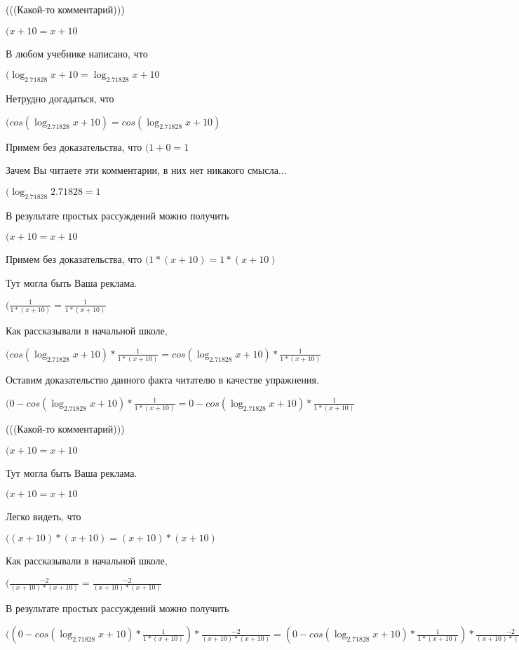 \documentclass[12pt,a4paper,fleqn]{article}
\theoremstyle{definition}
\begin{document}
(((Какой-то комментарий)))

$( x  +  10  =  x  +  10 $

В любом учебнике написано, что

$(\log_{ 2.71828 }{ x  +  10 } = \log_{ 2.71828 }{ x  +  10 }$

Нетрудно догадаться, что

$(cos(\log_{ 2.71828 }{ x  +  10 }) = cos(\log_{ 2.71828 }{ x  +  10 })$

Примем без доказательства, что
$( 1  +  0  =  1 $

Зачем Вы читаете эти комментарии, в них нет никакого смысла...

$(\log_{ 2.71828 }{ 2.71828 } =  1 $

В результате простых рассуждений можно получить

$( x  +  10  =  x  +  10 $

Примем без доказательства, что
$( 1  * ( x  +  10 ) =  1  * ( x  +  10 )$

Тут могла быть Ваша реклама.

$(\frac{ 1 }{ 1  * ( x  +  10 )}
 = \frac{ 1 }{ 1  * ( x  +  10 )}
$

Как рассказывали в начальной школе,

$(cos(\log_{ 2.71828 }{ x  +  10 }) * \frac{ 1 }{ 1  * ( x  +  10 )}
 = cos(\log_{ 2.71828 }{ x  +  10 }) * \frac{ 1 }{ 1  * ( x  +  10 )}
$

Оставим доказательство данного факта читателю в качестве упражнения.

$( 0  - cos(\log_{ 2.71828 }{ x  +  10 }) * \frac{ 1 }{ 1  * ( x  +  10 )}
 =  0  - cos(\log_{ 2.71828 }{ x  +  10 }) * \frac{ 1 }{ 1  * ( x  +  10 )}
$

(((Какой-то комментарий)))

$( x  +  10  =  x  +  10 $

Тут могла быть Ваша реклама.

$( x  +  10  =  x  +  10 $

Легко видеть, что

$(( x  +  10 ) * ( x  +  10 ) = ( x  +  10 ) * ( x  +  10 )$

Как рассказывали в начальной школе,

$(\frac{ -2 }{( x  +  10 ) * ( x  +  10 )}
 = \frac{ -2 }{( x  +  10 ) * ( x  +  10 )}
$

В результате простых рассуждений можно получить

$(( 0  - cos(\log_{ 2.71828 }{ x  +  10 }) * \frac{ 1 }{ 1  * ( x  +  10 )}
) * \frac{ -2 }{( x  +  10 ) * ( x  +  10 )}
 = ( 0  - cos(\log_{ 2.71828 }{ x  +  10 }) * \frac{ 1 }{ 1  * ( x  +  10 )}
) * \frac{ -2 }{( x  +  10 ) * ( x  +  10 )}
$
\end{document}
